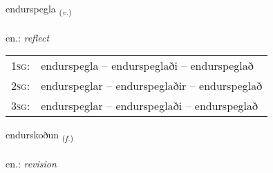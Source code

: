 \documentclass[frontgrid, backgrid]{flacards}\usepackage[]{graphicx}\usepackage[]{xcolor}
\begin{document}
\renewcommand{\blhead}{\vskip5pt {\small\bfseries\footnotesize Sagnorð | Verb }}
\renewcommand{\bcfoot}{\vskip5pt \hspace{2pt}{\small\bfseries\footnotesize 2K}}


{endurspegla \small{\textsubscript{(\textit{v.})}} \\[1ex] %
 \\
en.: \emph{reflect} \\  [2ex]
\renewcommand*{\arraystretch}{0.8}
\begin{tabular}{p{1cm}l}
\textsc{1sg}: & endurspegla -- endurspeglaði -- endurspeglað \\ 
\textsc{2sg}: & endurspeglar -- endurspeglaðir -- endurspeglað \\ 
\textsc{3sg}: & endurspeglar -- endurspeglaði -- endurspeglað \\ 
\end{tabular}
}

\renewcommand{\flhead}{\vskip5pt \fboxsep=0pt {\small\bfseries\footnotesize Nafnorð | Noun}}
\renewcommand{\fcfoot}{\vskip5pt \fboxsep=0pt \hspace{2pt}{\small\bfseries\footnotesize 2K}}

\renewcommand{\blhead}{\vskip5pt {\small\bfseries\footnotesize Nafnorð | Noun }}
\renewcommand{\bcfoot}{\vskip5pt \hspace{2pt}{\small\bfseries\footnotesize 2K}}


{endurskoðun \small{\textsubscript{(\textit{f.})}} \\[1ex] %
 \\
en.: \emph{revision} \\  [2ex]
\renewcommand*{\arraystretch}{0.8}
}
\end{document}
